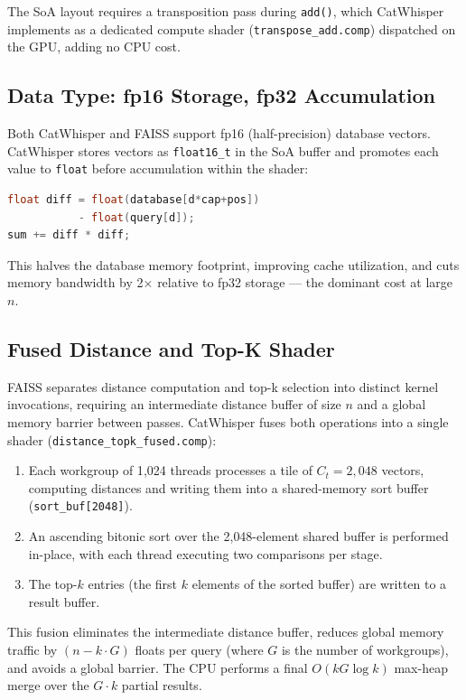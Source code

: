\documentclass[conference]{IEEEtran}
\begin{document}
The SoA layout requires a transposition pass during \texttt{add()}, which
CatWhisper implements as a dedicated compute shader
(\texttt{transpose\_add.comp}) dispatched on the GPU, adding no CPU cost.

\subsection{Data Type: fp16 Storage, fp32 Accumulation}

Both CatWhisper and FAISS support fp16 (half-precision) database vectors.
CatWhisper stores vectors as \texttt{float16\_t} in the SoA buffer and
promotes each value to \texttt{float} before accumulation within the shader:
\begin{lstlisting}[language=C,caption={fp16-to-fp32 accumulation in GLSL}]
float diff = float(database[d*cap+pos])
           - float(query[d]);
sum += diff * diff;
\end{lstlisting}
This halves the database memory footprint, improving cache utilization, and
cuts memory bandwidth by 2$\times$ relative to fp32 storage --- the dominant
cost at large $n$.

\subsection{Fused Distance and Top-K Shader}

FAISS separates distance computation and top-k selection into distinct kernel
invocations, requiring an intermediate distance buffer of size $n$ and a
global memory barrier between passes.  CatWhisper fuses both operations into
a single shader (\texttt{distance\_topk\_fused.comp}):

\begin{enumerate}
  \item Each workgroup of 1{,}024 threads processes a tile of $C_t = 2{,}048$
        vectors, computing distances and writing them into a shared-memory
        sort buffer (\texttt{sort\_buf[2048]}).
  \item An ascending bitonic sort over the 2{,}048-element shared buffer
        is performed in-place, with each thread executing two comparisons
        per stage.
  \item The top-$k$ entries (the first $k$ elements of the sorted buffer)
        are written to a result buffer.
\end{enumerate}

This fusion eliminates the intermediate distance buffer, reduces global memory
traffic by $(n - k \cdot G)$ floats per query (where $G$ is the number of
workgroups), and avoids a global barrier.  The CPU performs a final $O(k G
\log k)$ max-heap merge over the $G \cdot k$ partial results.
\end{document}
